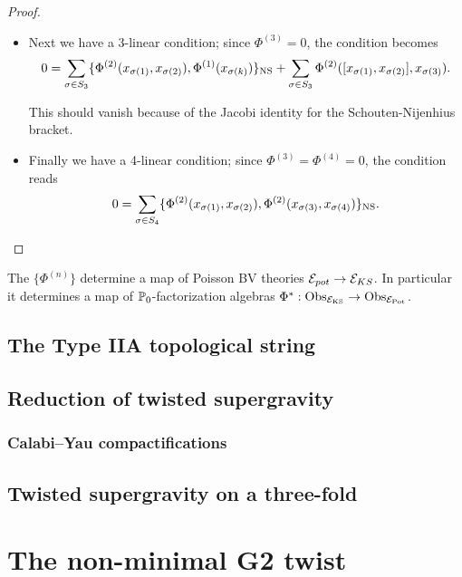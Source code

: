 \documentclass[11pt]{amsart}
\begin{document}
\begin{proof}
\begin{itemize}
    \item Next we have a 3-linear condition; since $\Phi^{(3)} = 0$, the condition becomes \[0=\sum_{\sigma\in S_{3}} \{\Phi^{(2)}(x_{\sigma(1)}, x_{\sigma(2)}), \Phi^{(1)}(x_{\sigma (k)})\}_{\rm NS} + \sum_{\sigma \in S_{3}}\Phi^{(2)}([x_{\sigma(1)}, x_{\sigma(2)}], x_{\sigma (3)}).\]

      This should vanish because of the Jacobi identity for the Schouten-Nijenhius bracket.

    \item Finally we have a 4-linear condition; since $\Phi^{(3)}=\Phi^{(4)}=0$, the condition reads \[0=\sum_{\sigma\in S_{4}} \{\Phi^{(2)}(x_{\sigma(1)}, x_{\sigma (2)}), \Phi^{(2)}(x_{\sigma(3)}, x_{\sigma (4)})\}_{\rm NS}.\]
  \end{itemize}
\end{proof}

\begin{cor}
The $\{\Phi^{(n)}\}$ determine a map of Poisson BV theories $\mathcal E_{pot}\to \mathcal E_{KS}$. In particular it determines a map of $\mathbb P_{0}$-factorization algebras $\Phi^{*} : {\rm Obs}_{\mathcal E_{\rm KS}}\to {\rm Obs}_{\mathcal E_{\rm Pot}}$.
\end{cor}

\subsection{The Type IIA topological string}
\label{IIAtop}
\subsection{Reduction of twisted supergravity}
\label{sec:orgcf7b6a4}
\subsubsection{Calabi--Yau compactifications}
\label{sec:org16a2c98}
\subsection{Twisted supergravity on a three-fold}
\label{sec:org774abb4}
\section{The non-minimal G2 twist}
\label{sec:org590ab85}

\end{document}
